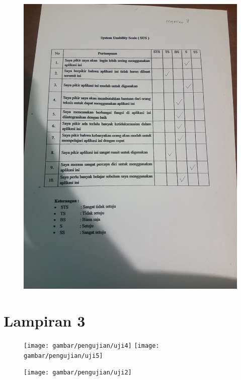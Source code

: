 \begin{figure}[H]
	\center
	\includegraphics [width = 17cm,angle=-90]{gambar/pengujian/pangkalan8}
\end{figure}

\chapter*{Lampiran 3}

\begin{figure}[H]
	\texttt{[image: gambar/pengujian/uji4]}
	\texttt{[image: gambar/pengujian/uji5]}
\end{figure}

\begin{figure}[H]
	\texttt{[image: gambar/pengujian/uji2]}
\end{figure}

